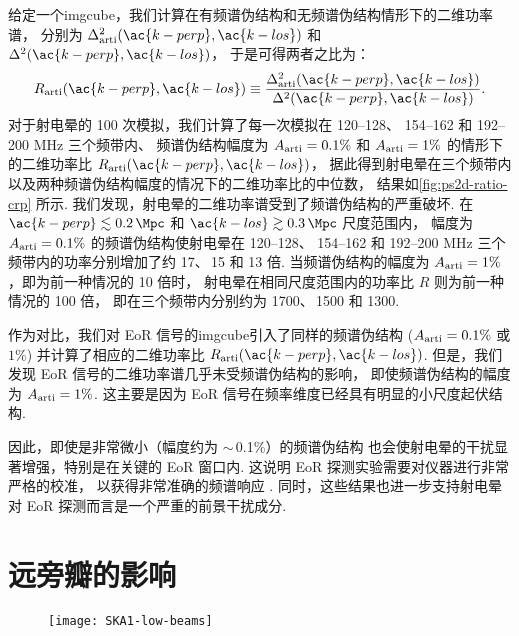 给定一个\ac{imgcube}，我们计算在有频谱伪结构和无频谱伪结构情形下的二维功率谱，
分别为 $\Delta^2_{\R{arti}}(\ac{k-perp}, \ac{k-los})$
和 $\Delta^2(\ac{k-perp}, \ac{k-los})$，
于是可得两者之比为：
\begin{equation}
  R_{\R{arti}}(\ac{k-perp}, \ac{k-los})
    \equiv \frac{\Delta^2_{\R{arti}}(\ac{k-perp}, \ac{k-los})}{
      \Delta^2(\ac{k-perp}, \ac{k-los})} .
\end{equation}
对于射电晕的 100 次模拟，我们计算了每一次模拟在 \numrange{120}{128}、
\numrange{154}{162} 和 \numrange{192}{200} \si{\MHz} 三个频带内、
频谱伪结构幅度为 $A_{\mathrm{arti}} = 0.1\%$ 和 $A_{\mathrm{arti}} = 1\%$
的情形下的二维功率比 $R_{\R{arti}}(\ac{k-perp}, \ac{k-los})$，
据此得到射电晕在三个频带内以及两种频谱伪结构幅度的情况下的二维功率比的中位数，
结果如\autoref{fig:ps2d-ratio-crp} 所示.
我们发现，射电晕的二维功率谱受到了频谱伪结构的严重破坏.
在 $\ac{k-perp} \lesssim \SI{0.2}{\per\Mpc}$ 和
$\ac{k-los} \gtrsim \SI{0.3}{\per\Mpc}$ 尺度范围内，
幅度为 $A_{\mathrm{arti}} = 0.1\%$ 的频谱伪结构使射电晕在 \numrange{120}{128}、
\numrange{154}{162} 和 \numrange{192}{200} \si{\MHz}
三个频带内的功率分别增加了约 17、\,15 和 13 倍.
当频谱伪结构的幅度为 $A_{\mathrm{arti}} = 1\%$，即为前一种情况的 10 倍时，
射电晕在相同尺度范围内的功率比 $R$ 则为前一种情况的 100 倍，
即在三个频带内分别约为 1700、\,1500 和 1300.

作为对比，我们对 EoR 信号的\ac{imgcube}引入了同样的频谱伪结构
($A_{\mathrm{arti}} = 0.1\%$ 或 $1\%$)
并计算了相应的二维功率比 $R_{\R{arti}}(\ac{k-perp}, \ac{k-los})$.
但是，我们发现 EoR 信号的二维功率谱几乎未受频谱伪结构的影响，
即使频谱伪结构的幅度为 $A_{\mathrm{arti}} = 1\%$.
这主要是因为 EoR 信号在频率维度已经具有明显的小尺度起伏结构.

因此，即使是非常微小（幅度约为 $\sim$\,0.1\%）的频谱伪结构
也会使射电晕的干扰显著增强，特别是在关键的 EoR 窗口内.
这说明 EoR 探测实验需要对仪器进行非常严格的校准，
以获得非常准确的频谱响应 \cite{barry2016}.
同时，这些结果也进一步支持射电晕对 EoR 探测而言是一个严重的前景干扰成分.


\section{远旁瓣的影响}
\label{sec:fscn}

\begin{figure}[htp]
  \centering
  \texttt{[image: SKA1-low-beams]}
  \label{fig:ska-beams}
\end{figure}

